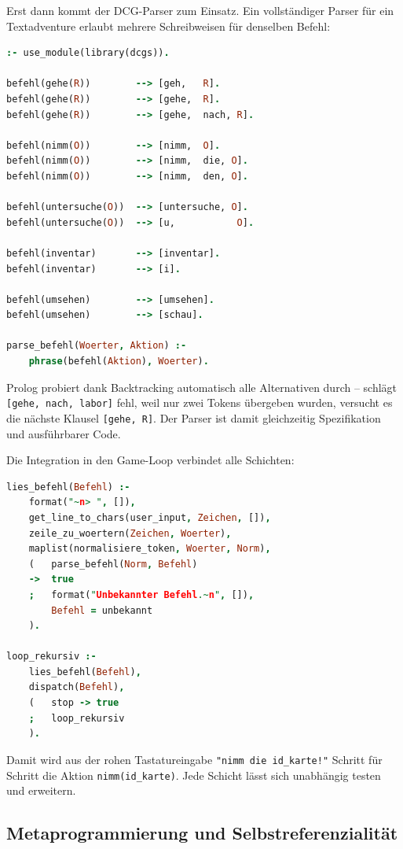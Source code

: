 \documentclass[parskip=half,a4paper,11pt]{scrreprt}
\begin{document}
Erst dann kommt der DCG-Parser zum Einsatz. Ein vollständiger Parser für ein Textadventure erlaubt mehrere Schreibweisen für denselben Befehl:

\begin{lstlisting}[language=Prolog, caption={DCG mit Synonymen und Artikeln}]
:- use_module(library(dcgs)).

befehl(gehe(R))        --> [geh,   R].
befehl(gehe(R))        --> [gehe,  R].
befehl(gehe(R))        --> [gehe,  nach, R].

befehl(nimm(O))        --> [nimm,  O].
befehl(nimm(O))        --> [nimm,  die, O].
befehl(nimm(O))        --> [nimm,  den, O].

befehl(untersuche(O))  --> [untersuche, O].
befehl(untersuche(O))  --> [u,           O].

befehl(inventar)       --> [inventar].
befehl(inventar)       --> [i].

befehl(umsehen)        --> [umsehen].
befehl(umsehen)        --> [schau].

parse_befehl(Woerter, Aktion) :-
    phrase(befehl(Aktion), Woerter).
\end{lstlisting}

Prolog probiert dank Backtracking automatisch alle Alternativen durch – schlägt \texttt{[gehe, nach, labor]} fehl, weil nur zwei Tokens übergeben wurden, versucht es die nächste Klausel \texttt{[gehe, R]}. Der Parser ist damit gleichzeitig Spezifikation und ausführbarer Code.

Die Integration in den Game-Loop verbindet alle Schichten:

\begin{lstlisting}[language=Prolog, caption={Komplette Pipeline im Game-Loop}]
lies_befehl(Befehl) :-
    format("~n> ", []),
    get_line_to_chars(user_input, Zeichen, []),
    zeile_zu_woertern(Zeichen, Woerter),
    maplist(normalisiere_token, Woerter, Norm),
    (   parse_befehl(Norm, Befehl)
    ->  true
    ;   format("Unbekannter Befehl.~n", []),
        Befehl = unbekannt
    ).

loop_rekursiv :-
    lies_befehl(Befehl),
    dispatch(Befehl),
    (   stop -> true
    ;   loop_rekursiv
    ).
\end{lstlisting}

Damit wird aus der rohen Tastatureingabe \texttt{"nimm die id\_karte!"} Schritt für Schritt die Aktion \texttt{nimm(id\_karte)}. Jede Schicht lässt sich unabhängig testen und erweitern.

\subsection{Metaprogrammierung und Selbstreferenzialität}
\end{document}
